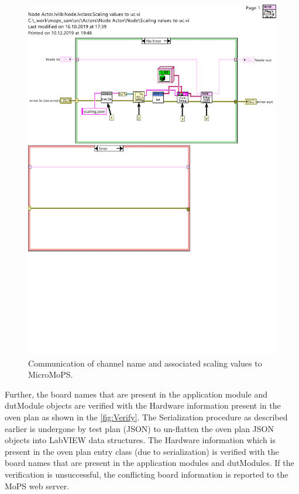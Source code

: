 \begin{figure}[hbt]
		\centering
		\includegraphics[trim=0 505 0 75, clip, width=150mm, scale=2]{images/Filterscalingvalues.pdf}
		\caption{Communication of channel name and associated scaling values to MicroMoPS.}
		\label{fig:Communication}
\end{figure}

Further, the board names that are present in the application module and dutModule objects are verified with the Hardware information present in the oven plan as shown in the \cref{fig:Verify}. 
The Serialization procedure as described earlier is undergone by test plan (JSON) to un-flatten the oven plan JSON objects into LabVIEW data structures. 
The Hardware information which is present in the oven plan entry class (due to serialization) is verified with the board names that are present in the application modules and dutModules.
If the verification is unsuccessful, the conflicting board information is reported to the MoPS web server. 

